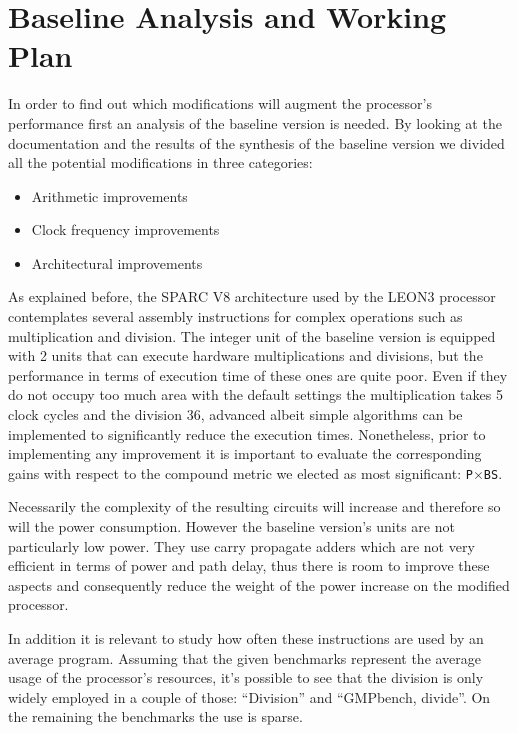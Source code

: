 \section{Baseline Analysis and Working Plan}
\label{sec:baseline}
In order to find out which modifications will augment the processor's performance first an analysis of the baseline version is needed.
By looking at the documentation and the results of the synthesis of the baseline version we divided all the potential modifications in three categories:

\begin{itemize}
  \item Arithmetic improvements
  \item Clock frequency improvements
  \item Architectural improvements
\end{itemize}

As explained before, the SPARC V8 architecture used by the LEON3 processor contemplates several assembly instructions for complex operations such as multiplication and division.
The integer unit of the baseline version is equipped with 2 units that can execute hardware multiplications and divisions, but the performance in terms of execution time of these ones are quite poor.
Even if they do not occupy too much area with the default settings the multiplication takes 5 clock cycles and the division 36, advanced albeit simple algorithms can be implemented to significantly reduce the execution times.
Nonetheless, prior to implementing any improvement it is important to evaluate the corresponding gains with respect to the compound metric we elected as most significant: \texttt{P}$\times$\texttt{BS}.

Necessarily the complexity of the resulting circuits will increase and therefore so will the power consumption. However the baseline version's units are not particularly low power. They use carry propagate adders which are not very efficient in terms of power and path delay, thus there is room to improve these aspects and consequently reduce the weight of the power increase on the modified processor.

In addition it is relevant to study how often these instructions are used by an average program.
Assuming that the given benchmarks represent the average usage of the processor's resources, it's possible to see that the division is only widely employed in a couple of those: ``Division'' and ``GMPbench, divide''. On the remaining the benchmarks the use is sparse.

